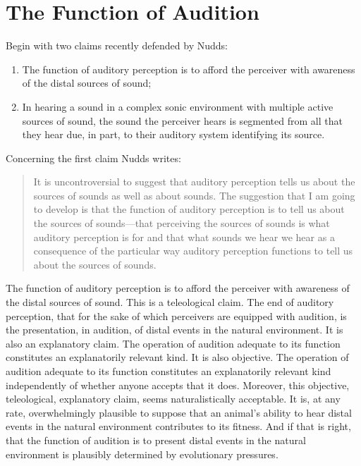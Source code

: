 \section{The Function of Audition} %
\label{sec:the_function_of_audition}


Begin with two claims recently defended by Nudds:
\begin{enumerate}[(1)]
	\item The function of auditory perception is to afford the perceiver with awareness of the distal sources of sound;
	\item In hearing a sound in a complex sonic environment with multiple active sources of sound, the sound the perceiver hears is segmented from all that they hear due, in part, to their auditory system identifying its source.
\end{enumerate}

Concerning the first claim Nudds writes:
\begin{quote}
	It is uncontroversial to suggest that auditory perception tells us about the sources of sounds as well as about sounds. The suggestion that I am going to develop is that the function of auditory perception is to tell us about the sources of sounds---that perceiving the sources of sounds is what auditory perception is for and that what sounds we hear we hear as a consequence of the particular way auditory perception functions to tell us about the sources of sounds. \citep[284]{Nudds:2010aa}
\end{quote}
The function of auditory perception is to afford the perceiver with awareness of the distal sources of sound. This is a teleological claim. The end of auditory perception, that for the sake of which perceivers are equipped with audition, is the presentation, in audition, of distal events in the natural environment. It is also an explanatory claim. The operation of audition adequate to its function constitutes an explanatorily relevant kind. It is also objective. The operation of audition adequate to its function constitutes an explanatorily relevant kind independently of whether anyone accepts that it does. Moreover, this objective, teleological, explanatory claim, seems naturalistically acceptable. It is, at any rate, overwhelmingly plausible to suppose that an animal's ability to hear distal events in the natural environment contributes to its fitness. And if that is right, that the function of audition is to present distal events in the natural environment is plausibly determined by evolutionary pressures.

